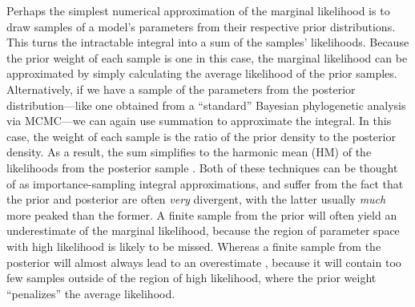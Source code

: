 Perhaps the simplest numerical approximation of the marginal likelihood is to
draw samples of a model's parameters from their respective prior distributions.
This turns the intractable integral into a sum of the samples' likelihoods.
Because the prior weight of each sample is one in this case, the marginal
likelihood can be approximated by simply calculating the average likelihood of
the prior samples.
Alternatively, if we have a sample of the parameters from the posterior
distribution---like one obtained from a ``standard'' Bayesian phylogenetic
analysis via MCMC---we can again use summation to approximate the integral.
In this case, the weight of each sample is the ratio of the prior density to
the posterior density.
As a result, the sum simplifies to the harmonic mean (HM) of the likelihoods
from the posterior sample \citep{Newton1994}.
Both of these techniques can be thought of as importance-sampling integral approximations, and suffer
from the fact that the prior and posterior are often \emph{very} divergent,
with the latter usually \emph{much} more peaked than the former.
A finite sample from the prior will often yield an underestimate of the
marginal likelihood, because the region of parameter space with high likelihood
is likely to be missed.
Whereas a finite sample from the posterior will almost always lead to an
overestimate \citep{Lartillot2006,Xie2011,Fan2011}, because it will contain too
few samples outside of the region of high likelihood, where the prior weight
``penalizes'' the average likelihood.

